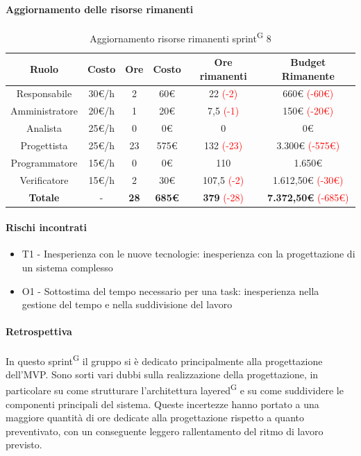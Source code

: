 \documentclass[a4paper, 11pt]{article}
\newcommand{\subsubsubsection}[1]{\paragraph{#1}}
\renewcommand{\arraystretch}{1.4} %
\begin{document}
\subsubsubsection{Aggiornamento delle risorse rimanenti}
\begin{table}[H]
	\centering
	\renewcommand{\arraystretch}{1.5}
	
	\begin{tabular}{|c|c|c|c|c|c|}
		\hline
		\textcolor{AccentColor}{\textbf{Ruolo}} &
		\textcolor{AccentColor}{\textbf{Costo}} &
		\textcolor{AccentColor}{\textbf{Ore}} &
		\textcolor{AccentColor}{\textbf{Costo}} &
		\textcolor{AccentColor}{\textbf{Ore rimanenti}} &
		\textcolor{AccentColor}{\textbf{Budget Rimanente}} \\ \hline
		
		Responsabile   & 30€/h & 2    & 60€     & 22 \textcolor{red}{(-2)}      & 660€ \textcolor{red}{(-60€)}      \\ \hline
		Amministratore & 20€/h & 1    & 20€     & 7,5 \textcolor{red}{(-1)}     & 150€ \textcolor{red}{(-20€)}      \\ \hline
		Analista       & 25€/h & 0    & 0€      & 0                             & 0€                                \\ \hline
		Progettista    & 25€/h & 23   & 575€    & 132 \textcolor{red}{(-23)}    & 3.300€ \textcolor{red}{(-575€)}   \\ \hline
		Programmatore  & 15€/h & 0    & 0€      & 110                           & 1.650€                            \\ \hline
		Verificatore   & 15€/h & 2    & 30€     & 107,5 \textcolor{red}{(-2)}   & 1.612,50€ \textcolor{red}{(-30€)} \\ \hline
		\textbf{Totale} & - & \textbf{28} & \textbf{685€} & \textbf{379} \textcolor{red}{(-28)} & \textbf{7.372,50€} \textcolor{red}{(-685€)} \\ \hline
	\end{tabular}
	\caption{Aggiornamento risorse rimanenti sprint\textsuperscript{G} 8}
\end{table}

\subsubsubsection{Rischi incontrati}
\begin{itemize}
	\item T1 - Inesperienza con le nuove tecnologie: inesperienza con la progettazione di un sistema complesso
	\item O1 - Sottostima del tempo necessario per una task: inesperienza nella gestione del tempo e nella suddivisione del lavoro
\end{itemize}

\subsubsubsection{Retrospettiva}
In questo sprint\textsuperscript{G} il gruppo si è dedicato principalmente alla progettazione dell'MVP.
Sono sorti vari dubbi sulla realizzazione della progettazione, in particolare su come strutturare l'architettura layered\textsuperscript{G} e su come suddividere le componenti principali del sistema. Queste incertezze hanno portato a una maggiore quantità di ore dedicate alla progettazione rispetto a quanto preventivato, con un conseguente leggero rallentamento del ritmo di lavoro previsto.\\
\end{document}
